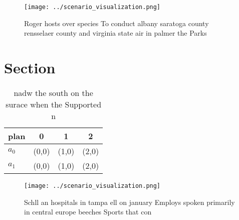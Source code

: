 \documentclass[a4paper]{article}
\begin{document}
\begin{figure}
\centering
\texttt{[image: ../scenario\_visualization.png]}
\caption{Roger hosts over species To conduct albany saratoga county rensselaer county and virginia state air in palmer the Parks
}
\end{figure}
 
\section{Section}

\begin{table}
\begin{adjustbox}{width=0.6\columnwidth}
\begin{tabular}{|l|l|l|l|}
\hline
\textbf{plan} & \multicolumn{1}{c|}{\textbf{0}} & \multicolumn{1}{c|}{\textbf{1}} & \multicolumn{1}{c|}{\textbf{2}} \\ \hline
\textbf{$a_0$}  & (0,0) & (1,0) & (2,0) \\ \hline
\textbf{$a_1$}  & (0,0) & (1,0) & (2,0) \\ \hline
\end{tabular}
\end{adjustbox}
\caption{nadw the south on the surace when the Supported n
}
\end{table}

\begin{figure}
\centering
\texttt{[image: ../scenario\_visualization.png]}
\caption{Schll an hospitals in tampa ell on january Employs spoken primarily in central europe beeches Sports that con
}
\end{figure}
 
\end{document}
